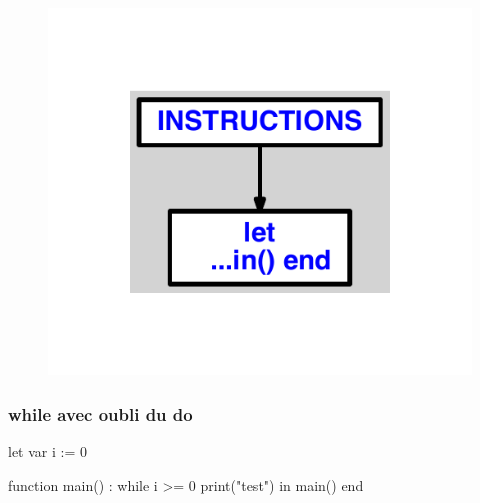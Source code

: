 \documentclass{article}
\begin{document}
\begin{figure}[H]\centering\includegraphics[max width=\textwidth]{ast/ast_317.pdf}\end{figure}\subsubsection{while avec oubli du do}
\begin{verbatimtab}
let
	var i := 0

	function main() :
		while i >= 0
			print("test")
in main() end
\end{verbatimtab}
\end{document}
